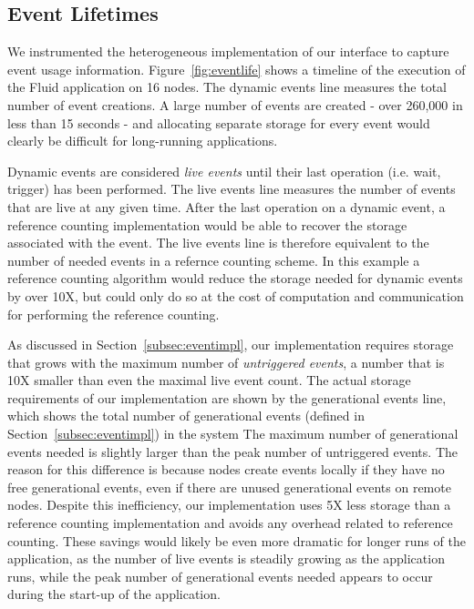 \subsection{Event Lifetimes}
\label{subsec:eventlife}

We instrumented the heterogeneous implementation of our interface to 
capture event usage information.  Figure~\ref{fig:eventlife} shows
a timeline of the execution of the Fluid application on 16 nodes.
The dynamic events line measures the total number of event creations.
A large number of events are created - over 260,000 in less than 15
seconds - and allocating separate storage for every event would clearly
be difficult for long-running applications.  

Dynamic events are considered {\em live events} until their last operation 
(i.e. wait, trigger) has been performed.  The live events line
measures the number of events that are live at any given time.  After
the last operation on a dynamic event, a reference counting implementation would
be able to recover the storage associated with the event.  The live events line
is therefore equivalent to the number of needed events in a refernce counting
scheme.  In this example 
a reference counting algorithm would reduce the storage needed for dynamic events
by over 10X, but could only do so at the cost of
computation and communication for performing the reference counting.  

As discussed in Section~\ref{subsec:eventimpl}, our implementation
requires storage that grows with the maximum number of {\em untriggered events}, a number
that is 10X smaller than even the maximal live event count.  The actual storage
requirements of our implementation are shown by the generational events line,
which shows the total number of generational events (defined in Section~\ref{subsec:eventimpl}) 
in the system
The maximum number of generational events needed is slightly larger than the peak number of untriggered events. 
The reason for this difference is because nodes create events locally if they have
no free generational events, even if there are unused generational events on remote nodes.
Despite this inefficiency, our implementation uses 5X less storage
than a reference counting implementation and avoids any overhead related to 
reference counting.  These savings would likely be even more dramatic for longer 
runs of the application, as the number of live events is steadily growing as the
application runs, while the peak number of generational events needed appears to 
occur during the start-up of the application.

